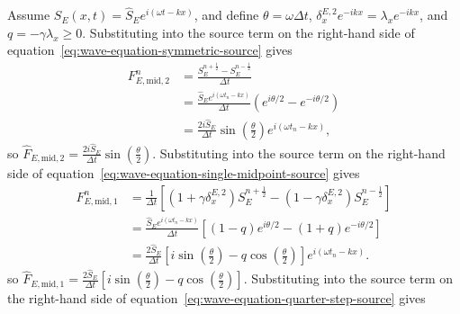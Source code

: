 \documentclass{article}
\numberwithin{figure}{section}
\begin{document}
Assume $S_E(x,t)=\widehat{S}_Ee^{i(\omega t-kx)}$, and define $\theta=\omega\Delta t$, $\delta_x^{E,2}e^{-ikx}=\lambda_xe^{-ikx}$, and $q=-\gamma\lambda_x\geq0$. Substituting into the source term on the right-hand side of equation~\eqref{eq:wave-equation-symmetric-source} gives
\begin{equation}
    \begin{aligned} F_{E,\mathrm{mid,2}}^n & =\frac{S_E^{n+\frac{1}{2}}-S_E^{n-\frac{1}{2}}}{\Delta t}                                      \\
                                     & =\frac{\widehat{S}_Ee^{i(\omega t_n-kx)}}{\Delta t}\left(e^{i\theta/2}-e^{-i\theta/2}\right) \\
                                     & =\frac{2i\widehat{S}_E}{\Delta t}\sin\left(\frac{\theta}{2}\right)e^{i(\omega t_n-kx)},
    \end{aligned} \label{eq:midpoint-both-source-amplitude}
\end{equation}
so $\widehat{F}_{E,\mathrm{mid,2}}=\frac{2i\widehat{S}_E}{\Delta t}\sin\left(\frac{\theta}{2}\right)$.
Substituting into the source term on the right-hand side of equation~\eqref{eq:wave-equation-single-midpoint-source} gives
\begin{equation}
    \begin{aligned} F_{E,\mathrm{mid,1}}^n & =\frac{1}{\Delta t}\left[\left(1+\gamma\delta_x^{E,2}\right)S_E^{n+\frac{1}{2}}-\left(1-\gamma\delta_x^{E,2}\right)S_E^{n-\frac{1}{2}}\right] \\
                                     & =\frac{\widehat{S}_Ee^{i(\omega t_n-kx)}}{\Delta t}\left[\left(1-q\right)e^{i\theta/2}-\left(1+q\right)e^{-i\theta/2}\right]                \\
                                     & =\frac{2\widehat{S}_E}{\Delta t}\left[i\sin\left(\frac{\theta}{2}\right)-q\cos\left(\frac{\theta}{2}\right)\right]e^{i(\omega t_n-kx)}.
    \end{aligned} \label{eq:midpoint-source-amplitude}
\end{equation}
so $\widehat{F}_{E,\mathrm{mid,1}}=\frac{2\widehat{S}_E}{\Delta t}\left[i\sin\left(\frac{\theta}{2}\right)-q\cos\left(\frac{\theta}{2}\right)\right]$.
Substituting into the source term on the right-hand side of equation~\eqref{eq:wave-equation-quarter-step-source} gives
\end{document}
